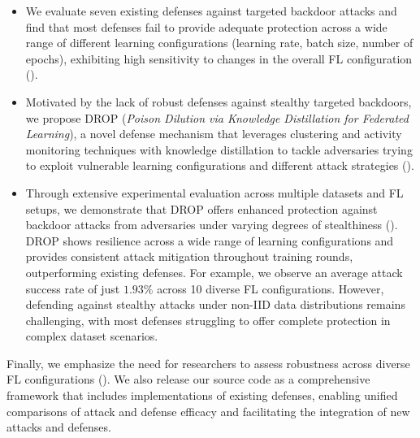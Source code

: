 \begin{itemize}  
    \item We evaluate seven existing defenses against targeted backdoor attacks and find that most defenses fail to provide adequate protection across a wide range of different learning configurations (learning rate, batch size, number of epochs), exhibiting high sensitivity to changes in the overall FL configuration ().  
    
    \item Motivated by the lack of robust defenses against stealthy targeted backdoors, we propose DROP (\textit{Poison Dilution via Knowledge Distillation for Federated Learning}), a novel defense mechanism that leverages clustering and activity monitoring techniques with  knowledge distillation to tackle adversaries trying to exploit vulnerable learning configurations and different attack strategies ().  
    \item Through extensive experimental evaluation across multiple datasets and FL setups, we demonstrate that DROP offers enhanced protection against backdoor attacks from adversaries under varying degrees of stealthiness (). DROP shows resilience across a wide range of learning configurations and provides consistent attack mitigation throughout training rounds, outperforming existing defenses. For example, we observe an average attack success rate of just $1.93\%$ across 10 diverse FL configurations. However, defending against stealthy attacks under non-IID data distributions remains challenging, with most defenses struggling to offer complete protection in complex dataset scenarios.
\end{itemize}
Finally, we emphasize the need for researchers to assess robustness across diverse FL configurations ().
We also release our source code as a comprehensive framework that includes implementations of existing defenses, enabling unified comparisons of attack and defense efficacy and facilitating the integration of new attacks and defenses.